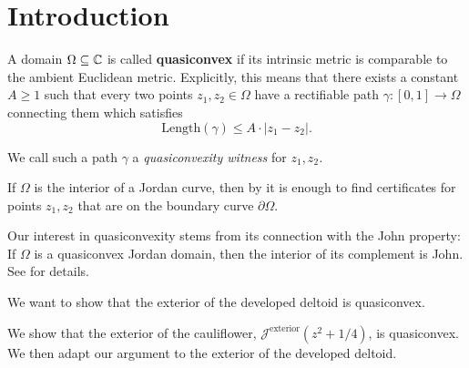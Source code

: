 


\section{Introduction}
A domain $\Omega\subseteq\mathbb{C}$ is called \textbf{quasiconvex }if its
intrinsic metric is comparable to the ambient Euclidean metric. Explicitly,
this means that there exists a constant $A\geq1$ such that every
two points $z_{1},z_{2}\in\Omega$ have a rectifiable path $\gamma:\left[0,1\right]\to\Omega$
connecting them which satisfies %
\[
\mathrm{Length}(\gamma)\leq A\cdot\left|z_{1}-z_{2}\right|.
\]

We call such a path $\gamma$ a \emph{quasiconvexity witness }for\emph{
$z_{1},z_{2}$.}%
\begin{comment}
The space $X$ is called \textbf{quasiconvex }if there is a constant
$C$ such that every pair of points $z_{1},z_{2}\in X$ can be connected
by a $C$-quasiconvex path. In other words, the intrinsic metric on
$X$ is comparable to the ambient Euclidean metric. 
\end{comment}

If $\Omega$ is the interior of a Jordan curve, then by \cite[Corollary F]{key-1}
it is enough to find certificates for points $z_{1},z_{2}$ that are
on the boundary curve $\partial\Omega$.%
\begin{comment}
It is also shown in \cite{key-1} that any quasidisk is quasiconvex.
\end{comment}

Our interest in quasiconvexity stems from its connection with the
John property: If $\Omega$ is a quasiconvex Jordan domain, then the
interior of its complement is John. See \cite[Corollary 3.4]{key-1}
for details. 

We want to show that the exterior of the developed deltoid is quasiconvex. 

We show that the exterior of the cauliflower, $\mathcal{J}^{\text{exterior}}(z^{2}+1/4)$,
is quasiconvex. We then adapt our argument to the exterior of the developed deltoid.

\begin{comment}
The Filled Julia set of $z^{2}+1/4$, called the cauliflower, has
an inward-pointing cusp and hence is not quasiconvex.
\end{comment}

\begin{comment}
Thus, for any $c$ in 

For values $c$ in quadratic polynomials $f_{c}(z)=z^{2}+c$
\end{comment}
\begin{comment}
If $f_{c}$ has an attracting fixed point then its Julia set $\mathcal{J}(f_{c})$
is a quasicircle, hence its interior and exterior are both quasiconvex.
This is the case for values of $c$ in the main cardioid of the Mandelbrot
set.
\end{comment}
\begin{comment}
, i.e. for 
\[
c\in\left\{ -\frac{\lambda}{2}-\frac{\lambda^{2}}{4}:\,\left|\lambda\right|<1\right\} .
\]
\end{comment}

